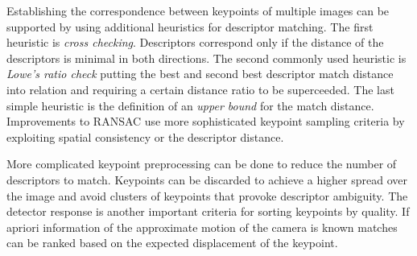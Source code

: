 Establishing the correspondence between keypoints of multiple images can be supported by using additional heuristics for descriptor matching.
The first heuristic is \emph{cross checking}.
Descriptors correspond only if the distance of the descriptors is minimal in both directions.
The second commonly used heuristic is \emph{Lowe's ratio check}\cite{lowe_ijcv2004} putting the best and second best descriptor match distance into relation and requiring a certain distance ratio to be superceeded.
The last simple heuristic is the definition of an \emph{upper bound} for the match distance.
Improvements to \acrshort{RANSAC}\cite{sattler_iccv2009,chum_cvpr2005} use more sophisticated keypoint sampling criteria by exploiting spatial consistency or the descriptor distance.

More complicated keypoint preprocessing can be done to reduce the number of descriptors to match.
Keypoints can be discarded to achieve a higher spread over the image and avoid clusters of keypoints that provoke descriptor ambiguity.
The detector response is another important criteria for sorting keypoints by quality.
If apriori information of the approximate motion of the camera is known matches can be ranked based on the expected displacement of the keypoint.
